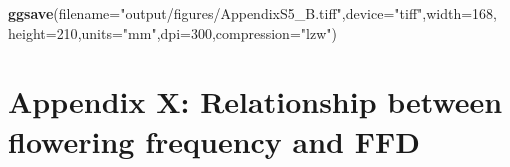 \documentclass[
]{article}
\newenvironment{Shaded}{\begin{snugshade}}{\end{snugshade}}
\newcommand{\DataTypeTok}[1]{\textcolor[rgb]{0.13,0.29,0.53}{#1}}
\newcommand{\DecValTok}[1]{\textcolor[rgb]{0.00,0.00,0.81}{#1}}
\newcommand{\KeywordTok}[1]{\textcolor[rgb]{0.13,0.29,0.53}{\textbf{#1}}}
\newcommand{\NormalTok}[1]{#1}
\newcommand{\StringTok}[1]{\textcolor[rgb]{0.31,0.60,0.02}{#1}}
\begin{document}
\begin{Shaded}
\begin{Highlighting}[]
\KeywordTok{ggsave}\NormalTok{(}\DataTypeTok{filename=}\StringTok{"output/figures/AppendixS5\_B.tiff"}\NormalTok{,}\DataTypeTok{device=}\StringTok{"tiff"}\NormalTok{,}\DataTypeTok{width=}\DecValTok{168}\NormalTok{,}
       \DataTypeTok{height=}\DecValTok{210}\NormalTok{,}\DataTypeTok{units=}\StringTok{"mm"}\NormalTok{,}\DataTypeTok{dpi=}\DecValTok{300}\NormalTok{,}\DataTypeTok{compression=}\StringTok{"lzw"}\NormalTok{)}
\end{Highlighting}
\end{Shaded}

\hypertarget{appendix-x-relationship-between-flowering-frequency-and-ffd}{%
\section{Appendix X: Relationship between flowering frequency and
FFD}\label{appendix-x-relationship-between-flowering-frequency-and-ffd}}
\end{document}
